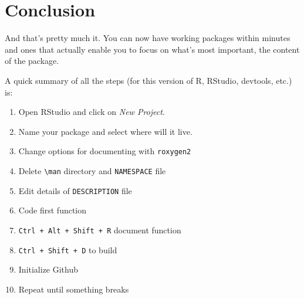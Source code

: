\documentclass[pdftex,11pt,a4paper]{article}
\begin{document}
\section*{Conclusion}
And that's pretty much it. You can now have working packages within minutes and ones that actually enable you to focus on what's most important, the content of the package. 

A quick summary of all the steps (for this version of R, RStudio, devtools, etc.) is:

\begin{enumerate}	
	\item Open RStudio and click on \textit{New Project}. 
	\item Name your package and select where will it live.
	\item Change options for documenting with \verb|roxygen2|
	\item Delete \verb|\man| directory and \verb|NAMESPACE| file
	\item Edit details of \verb|DESCRIPTION| file
	\item Code first function
	\item \verb|Ctrl + Alt + Shift + R| document function
	\item \verb|Ctrl + Shift + D| to build
	\item Initialize Github
	\item Repeat until something breaks 
\end{enumerate}
\end{document}
